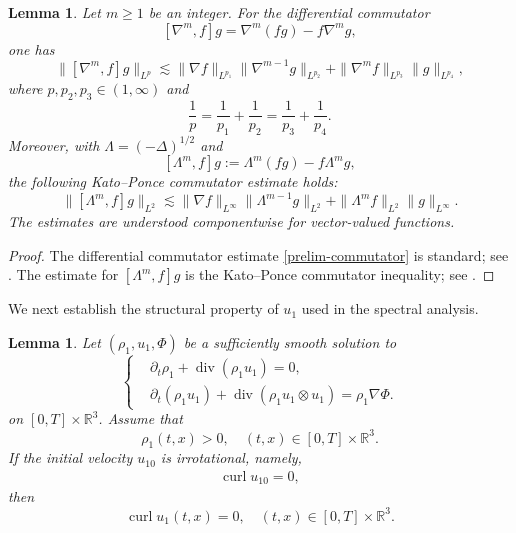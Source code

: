 \documentclass[10pt,reqno]{amsart}
\numberwithin{equation}{section}
\newtheorem{lem}[thm]{Lemma}
\begin{document}
\begin{lem} \label{lem-prelim-commutator}
Let $m\geq1$ be an integer.  For the differential commutator
\[ 
[\nabla^m,f]g=\nabla^m(fg)-f\nabla^m g,
\] 
one has
\begin{equation}\label{prelim-commutator}
\big\|[\nabla^m,f]g\big\|_{L^p}
\lesssim
\|\nabla f\|_{L^{p_1}}\|\nabla^{m-1}g\|_{L^{p_2}}
+
\|\nabla^m f\|_{L^{p_3}}\|g\|_{L^{p_4}},
\end{equation}
where $p,p_2,p_3\in(1,\infty)$ and
\[ 
\frac{1}{p}
=\frac{1}{p_1}+\frac{1}{p_2}
=\frac{1}{p_3}+\frac{1}{p_4}.
\] 
Moreover, with $\Lambda=(-\Delta)^{1/2}$ and
\[
[\Lambda^m,f]g:=\Lambda^m(fg)-f\Lambda^m g,
\]
the following Kato--Ponce commutator estimate holds:
\[
\big\|[\Lambda^m,f]g\big\|_{L^2}
\lesssim
\|\nabla f\|_{L^\infty}\|\Lambda^{m-1}g\|_{L^2}
+
\|\Lambda^m f\|_{L^2}\|g\|_{L^\infty}.
\]
The estimates are understood componentwise for vector-valued functions.
\end{lem}
\begin{proof}
The differential commutator estimate \eqref{prelim-commutator} is standard; see
\cite[Lemma A.3]{Wan12}.  The estimate for $[\Lambda^m,f]g$ is the
Kato--Ponce commutator inequality; see \cite{KP88}.
\end{proof}
 

We next establish the structural property of $u_1$ used in the spectral analysis.

\begin{lem}\label{lem-irrotational}
	Let $(\rho_1,u_1,\Phi)$ be a sufficiently smooth solution to
	\begin{equation}\label{eq:rho1-u1-system}
		\left\{ \begin{aligned}
			&\partial_t\rho_1+\operatorname{div}(\rho_1u_1)=0,\\
			&\partial_t(\rho_1u_1)
			+\operatorname{div}(\rho_1u_1\otimes u_1)
			=\rho_1\nabla\Phi.
		\end{aligned}\right.
	\end{equation}	
	on $[0,T]\times\mathbb{R}^3$. Assume that
	\begin{equation}
		\rho_1(t,x)>0,
		\quad
		(t,x)\in[0,T]\times\mathbb{R}^3.
		\label{eq:rho1-positive}
	\end{equation}
	If the initial velocity $u_{10}$ is irrotational, namely,
	\begin{align}
	\operatorname{curl}u_{10}=0,
		\label{eq:initial-irrotational}
	\end{align}
	then 
\[ 
		\operatorname{curl}u_1(t,x)=0,
		\quad
		(t,x)\in[0,T]\times\mathbb{R}^3.
\] 
\end{lem}
\end{document}
